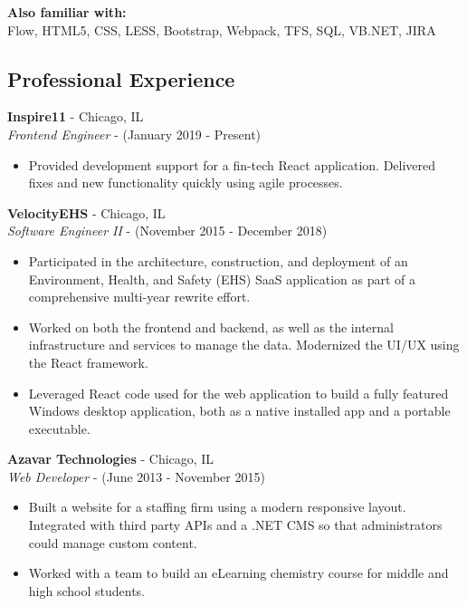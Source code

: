 \documentclass[12pt]{article}
\begin{document}
\begin{paracol}{2}
\noindent \textbf{Also familiar with:}\\
Flow, HTML5, CSS, LESS, Bootstrap, Webpack, TFS, SQL, VB.NET, JIRA

\switchcolumn 

\subsection*{Professional Experience} 

\textbf{Inspire11} - Chicago, IL \\
\textit{Frontend Engineer} - {\footnotesize{(January 2019 - Present)}} 
\begin{itemize}
    \item {\footnotesize{Provided development support for a fin-tech React application. Delivered fixes and new functionality quickly using agile processes.}}
\end{itemize} 

\noindent \textbf{VelocityEHS} - Chicago, IL \\
\textit{Software Engineer II} - {\footnotesize{(November 2015 - December 2018)}}
\begin{itemize}
    \item {\footnotesize{Participated in the architecture, construction, and deployment of an Environment, Health, and Safety (EHS) SaaS application as part of a comprehensive multi-year rewrite effort.}}
    \item {\footnotesize{Worked on both the frontend and backend, as well as the internal infrastructure and services to manage the data.  Modernized the UI/UX using the React framework.}}
    \item {\footnotesize{Leveraged React code used for the web application to build a fully featured Windows desktop application, both as a native installed app and a portable executable.}}
\end{itemize} 

\noindent \textbf{Azavar Technologies} - Chicago, IL \\
\textit{Web Developer} - {\footnotesize(June 2013 - November 2015)}
\begin{itemize}
    \item {\footnotesize{Built a website for a staffing firm using a modern responsive layout. Integrated with third party APIs and a .NET CMS so that administrators could manage custom content.}}
    \item {\footnotesize{Worked with a team to build an eLearning chemistry course for middle and high school students.}} 
\end{itemize}


\end{paracol}
\end{document}
